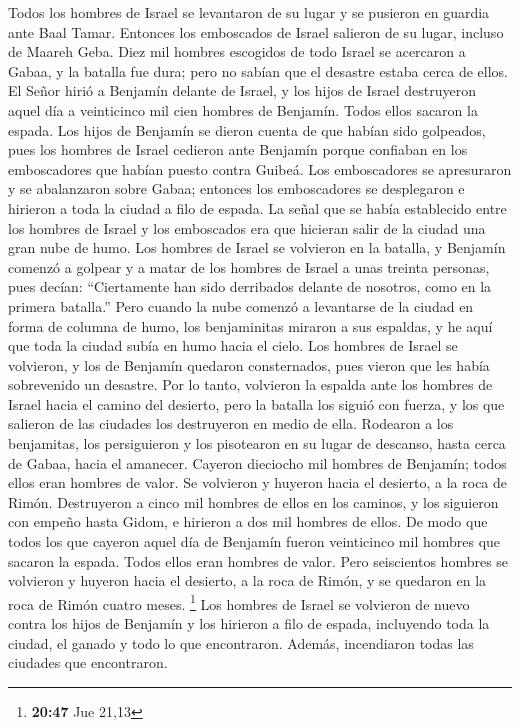  Todos los hombres de Israel se levantaron de su lugar y
se pusieron en guardia ante Baal Tamar. Entonces los emboscados de
Israel salieron de su lugar, incluso de Maareh Geba. 
Diez mil hombres escogidos de todo Israel se acercaron a Gabaa, y la
batalla fue dura; pero no sabían que el desastre estaba cerca de ellos.
 El Señor hirió a Benjamín delante de Israel, y los hijos
de Israel destruyeron aquel día a veinticinco mil cien hombres de
Benjamín. Todos ellos sacaron la espada.  Los hijos de
Benjamín se dieron cuenta de que habían sido golpeados, pues los hombres
de Israel cedieron ante Benjamín porque confiaban en los emboscadores
que habían puesto contra Guibeá.  Los emboscadores se
apresuraron y se abalanzaron sobre Gabaa; entonces los emboscadores se
desplegaron e hirieron a toda la ciudad a filo de espada.
 La señal que se había establecido entre los hombres de
Israel y los emboscados era que hicieran salir de la ciudad una gran
nube de humo.  Los hombres de Israel se volvieron en la
batalla, y Benjamín comenzó a golpear y a matar de los hombres de Israel
a unas treinta personas, pues decían: ``Ciertamente han sido derribados
delante de nosotros, como en la primera batalla.''  Pero
cuando la nube comenzó a levantarse de la ciudad en forma de columna de
humo, los benjaminitas miraron a sus espaldas, y he aquí que toda la
ciudad subía en humo hacia el cielo.  Los hombres de
Israel se volvieron, y los de Benjamín quedaron consternados, pues
vieron que les había sobrevenido un desastre.  Por lo
tanto, volvieron la espalda ante los hombres de Israel hacia el camino
del desierto, pero la batalla los siguió con fuerza, y los que salieron
de las ciudades los destruyeron en medio de ella. 
Rodearon a los benjamitas, los persiguieron y los pisotearon en su lugar
de descanso, hasta cerca de Gabaa, hacia el amanecer. 
Cayeron dieciocho mil hombres de Benjamín; todos ellos eran hombres de
valor.  Se volvieron y huyeron hacia el desierto, a la
roca de Rimón. Destruyeron a cinco mil hombres de ellos en los caminos,
y los siguieron con empeño hasta Gidom, e hirieron a dos mil hombres de
ellos.  De modo que todos los que cayeron aquel día de
Benjamín fueron veinticinco mil hombres que sacaron la espada. Todos
ellos eran hombres de valor.  Pero seiscientos hombres se
volvieron y huyeron hacia el desierto, a la roca de Rimón, y se quedaron
en la roca de Rimón cuatro meses. \footnote{\textbf{20:47} Jue 21,13}
 Los hombres de Israel se volvieron de nuevo contra los
hijos de Benjamín y los hirieron a filo de espada, incluyendo toda la
ciudad, el ganado y todo lo que encontraron. Además, incendiaron todas
las ciudades que encontraron.


